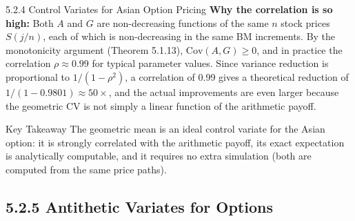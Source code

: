 \documentclass[aspectratio=169,10pt]{beamer}
\begin{document}
\begin{frame}[allowframebreaks]{5.2.4 Control Variates for Asian Option Pricing}
\textbf{Why the correlation is so high:} Both $A$ and $G$ are non-decreasing
functions of the same $n$ stock prices $S(j/n)$, each of which is non-decreasing
in the same BM increments.  By the monotonicity argument (Theorem 5.1.13),
$\mathrm{Cov}(A, G) \ge 0$, and in practice the correlation $\rho \approx 0.99$
for typical parameter values.  Since variance reduction is proportional to
$1/(1 - \rho^2)$, a correlation of 0.99 gives a theoretical reduction of
$1/(1 - 0.9801) \approx 50\times$, and the actual improvements are even larger
because the geometric CV is not simply a linear function of the arithmetic payoff.

\begin{alertblock}{Key Takeaway}
  The geometric mean is an ideal control variate for the Asian option: it is
  strongly correlated with the arithmetic payoff, its exact expectation is
  analytically computable, and it requires no extra simulation (both are
  computed from the same price paths).
\end{alertblock}

\end{frame}

\subsection{5.2.5 Antithetic Variates for Options}
\end{document}
